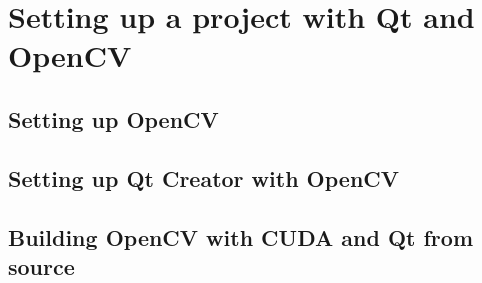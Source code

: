 \chapter{Setting up a project with Qt and OpenCV}\label{chp:setup}

\section{Setting up OpenCV}

\section{Setting up Qt Creator with OpenCV}

\section{Building OpenCV with CUDA and Qt from source}